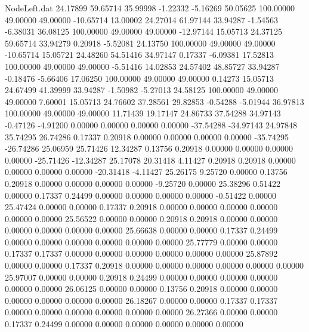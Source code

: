 \begin{filecontents}{NodeLeft.dat}
  24.17899   59.65714   35.99998    -1.22332   -5.16269   50.05625  100.00000   49.00000   49.00000  -10.65714   13.00002
  24.27014   61.97144   33.94287    -1.54563   -6.38031   36.08125  100.00000   49.00000   49.00000  -12.97144   15.05713
  24.37125   59.65714   33.94279     0.20918   -5.52081   24.13750  100.00000   49.00000   49.00000  -10.65714   15.05721
  24.48260   54.51416   34.97147     0.17337   -6.09381   17.52813  100.00000   49.00000   49.00000   -5.51416   14.02853
  24.57402   48.85727   33.94287    -0.18476   -5.66406   17.06250  100.00000   49.00000   49.00000    0.14273   15.05713
  24.67499   41.39999   33.94287    -1.50982   -5.27013   24.58125  100.00000   49.00000   49.00000    7.60001   15.05713
  24.76602   37.28561   29.82853    -0.54288   -5.01944   36.97813  100.00000   49.00000   49.00000   11.71439   19.17147
  24.86733   37.54288   34.97143    -0.47126   -4.91200    0.00000    0.00000    0.00000    0.00000  -37.54288  -34.97143
  24.97848   35.74295   26.74286     0.17337    0.20918    0.00000    0.00000    0.00000    0.00000  -35.74295  -26.74286
  25.06959   25.71426   12.34287     0.13756    0.20918    0.00000    0.00000    0.00000    0.00000  -25.71426  -12.34287
  25.17078   20.31418    4.11427     0.20918    0.20918    0.00000    0.00000    0.00000    0.00000  -20.31418   -4.11427
  25.26175    9.25720    0.00000     0.13756    0.20918    0.00000    0.00000    0.00000    0.00000   -9.25720    0.00000
  25.38296    0.51422    0.00000     0.17337    0.24499    0.00000    0.00000    0.00000    0.00000   -0.51422    0.00000
  25.47424    0.00000    0.00000     0.17337    0.20918    0.00000    0.00000    0.00000    0.00000    0.00000    0.00000
  25.56522    0.00000    0.00000     0.20918    0.20918    0.00000    0.00000    0.00000    0.00000    0.00000    0.00000
  25.66638    0.00000    0.00000     0.17337    0.24499    0.00000    0.00000    0.00000    0.00000    0.00000    0.00000
  25.77779    0.00000    0.00000     0.17337    0.17337    0.00000    0.00000    0.00000    0.00000    0.00000    0.00000
  25.87892    0.00000    0.00000     0.17337    0.20918    0.00000    0.00000    0.00000    0.00000    0.00000    0.00000
  25.97007    0.00000    0.00000     0.20918    0.24499    0.00000    0.00000    0.00000    0.00000    0.00000    0.00000
  26.06125    0.00000    0.00000     0.13756    0.20918    0.00000    0.00000    0.00000    0.00000    0.00000    0.00000
  26.18267    0.00000    0.00000     0.17337    0.17337    0.00000    0.00000    0.00000    0.00000    0.00000    0.00000
  26.27366    0.00000    0.00000     0.17337    0.24499    0.00000    0.00000    0.00000    0.00000    0.00000    0.00000

\end{filecontents}
